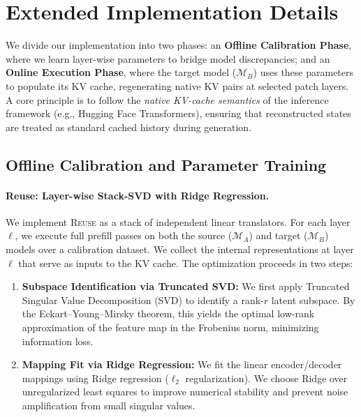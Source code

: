 \documentclass{article}
\theoremstyle{plain}
\theoremstyle{definition}
\theoremstyle{remark}
\begin{document}
\section{Extended Implementation Details}
\label{sec:details}

We divide our implementation into two phases: an \textbf{Offline Calibration Phase}, where we learn layer-wise parameters to bridge model discrepancies; and an \textbf{Online Execution Phase}, where the target model ($\mathcal{M}_B$) uses these parameters to populate its KV cache, regenerating native KV pairs at selected patch layers. A core principle is to follow the \textit{native KV-cache semantics} of the inference framework (e.g., Hugging Face Transformers), ensuring that reconstructed states are treated as standard cached history during generation.

\subsection{Offline Calibration and Parameter Training}

\paragraph{Reuse: Layer-wise Stack-SVD with Ridge Regression.}
We implement \textsc{Reuse} as a stack of independent linear translators. For each layer $\ell$, we execute full prefill passes on both the source ($\mathcal{M}_A$) and target ($\mathcal{M}_B$) models over a calibration dataset. We collect the internal representations at layer $\ell$ that serve as inputs to the KV cache. The optimization proceeds in two steps:

\begin{enumerate}
    \setlength{\itemsep}{1pt}
    \setlength{\parskip}{0pt}
    \setlength{\topsep}{2pt}
    \item \textbf{Subspace Identification via Truncated SVD:}
    We first apply Truncated Singular Value Decomposition (SVD) to identify a rank-$r$ latent subspace. By the Eckart--Young--Mirsky theorem, this yields the optimal low-rank approximation of the feature map in the Frobenius norm, minimizing information loss.

    \item \textbf{Mapping Fit via Ridge Regression:}
    We fit the linear encoder/decoder mappings using Ridge regression ($\ell_2$ regularization). We choose Ridge over unregularized least squares to improve numerical stability and prevent noise amplification from small singular values.
\end{enumerate}
\end{document}
